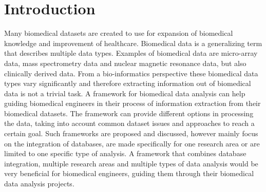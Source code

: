 \graphicspath{ {./ThesisFigures/} }

	\tableofcontents
	
	
	\pagestyle{fancy}
	\fancyhead{} %
	\fancyfoot{} %
	\renewcommand{\headrulewidth}{0.4pt}
	\renewcommand{\footrulewidth}{0.4pt}
	
	\fancyhead[L]{\rightmark}
	\fancyfoot[C]{\thepage}
	
	
	\clearpage
	
	\newpage
	\section{Introduction}
	\label{sec:Introduction}
	
	Many biomedical datasets are created to use for expansion of biomedical knowledge and improvement of healthcare. Biomedical data is a generalizing term that describes multiple data types\cite{gehlenborg2010visualization}. Examples of biomedical data are micro-array data\cite{brazma2001minimum}, mass spectrometry data\cite{cottrell1999probability, dettmer2007mass} and nuclear magnetic resonance data\cite{capitani2017nuclear}, but also clinically derived data\cite{liu2012data, sittig2008grand}. From a bio-informatics perspective these biomedical data types vary significantly\cite{gehlenborg2010visualization} and therefore extracting information out of biomedical data is not a trivial task. A framework for biomedical data analysis can help guiding biomedical engineers in their process of information extraction from their biomedical datasets. The framework can provide different options in processing the data, taking into account common dataset issues\cite{bertolazzi2008logic, piatetsky2003microarray,lommen2009metalign} and approaches to reach a certain goal\cite{holzinger2014knowledge, wilkins2009proteomics}. Such frameworks are proposed and discussed, however mainly focus on the integration of databases\cite{teodoro2009biomedical, doi:10.1093/nar/gkm1037}, are made specifically for one research area\cite{sturn2002genesis, karnovsky2011metscape, tabas2012genecodis3} or are limited to one specific type of analysis\cite{faul2007g}. A framework that combines database integration, multiple research areas and multiple types of data analysis would be very beneficial for biomedical engineers, guiding them through their biomedical data analysis projects.
	
